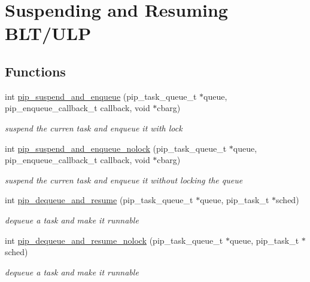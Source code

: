 \hypertarget{group__ulp-2-suspension}{\section{Suspending and Resuming B\-L\-T/\-U\-L\-P}
\label{group__ulp-2-suspension}
}
\subsection*{Functions}
\begin{DoxyCompactItemize}
\item 
int \hyperlink{group__ulp-2-suspension_ga7dbf7e64e78cd00ef62c3bb04f289a68}{pip\-\_\-suspend\-\_\-and\-\_\-enqueue} (pip\-\_\-task\-\_\-queue\-\_\-t $\ast$queue, pip\-\_\-enqueue\-\_\-callback\-\_\-t callback, void $\ast$cbarg)
\begin{DoxyCompactList}\small\item\em suspend the curren task and enqueue it with lock \end{DoxyCompactList}\item 
int \hyperlink{group__ulp-2-suspension_gab78d289ab89fa2981f2910849b1b2df7}{pip\-\_\-suspend\-\_\-and\-\_\-enqueue\-\_\-nolock} (pip\-\_\-task\-\_\-queue\-\_\-t $\ast$queue, pip\-\_\-enqueue\-\_\-callback\-\_\-t callback, void $\ast$cbarg)
\begin{DoxyCompactList}\small\item\em suspend the curren task and enqueue it without locking the queue \end{DoxyCompactList}\item 
int \hyperlink{group__ulp-2-suspension_gaaff299f195e2397f17cf11016c8a394f}{pip\-\_\-dequeue\-\_\-and\-\_\-resume} (pip\-\_\-task\-\_\-queue\-\_\-t $\ast$queue, pip\-\_\-task\-\_\-t $\ast$sched)
\begin{DoxyCompactList}\small\item\em dequeue a task and make it runnable \end{DoxyCompactList}\item 
int \hyperlink{group__ulp-2-suspension_gab3c26770ac6de70ad11239dc301bd403}{pip\-\_\-dequeue\-\_\-and\-\_\-resume\-\_\-nolock} (pip\-\_\-task\-\_\-queue\-\_\-t $\ast$queue, pip\-\_\-task\-\_\-t $\ast$sched)
\begin{DoxyCompactList}\small\item\em dequeue a task and make it runnable \end{DoxyCompactList}\item 

\end{DoxyCompactItemize}
